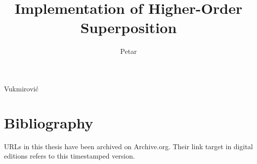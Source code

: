 \documentclass{dissertation}
\begin{document}
\title{Implementation of Higher-Order Superposition}
\author{Petar}{Vukmirović}

\frontmatter




\tableofcontents




\mainmatter

\thumbtrue












%

\thumbfalse

\chapter*{Bibliography}

URLs in this thesis have been archived on Archive.org. Their link target in digital editions refers
to this timestamped version.





\glsaddall
\printglossary[type=\acronymtype,title={Glossary}]




\end{document}
